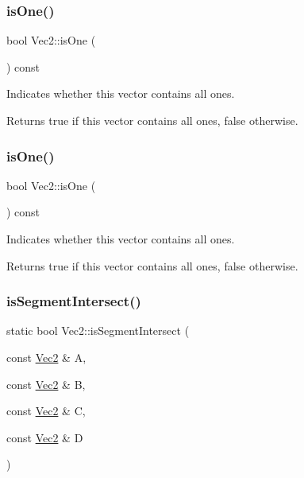 \subsubsection{\texorpdfstring{is\+One()}{isOne()}\hspace{0.1cm}{\footnotesize\ttfamily [1/2]}}
{\footnotesize\ttfamily bool Vec2\+::is\+One (\begin{DoxyParamCaption}{ }\end{DoxyParamCaption}) const\hspace{0.3cm}{\ttfamily [inline]}}

Indicates whether this vector contains all ones.

\begin{DoxyReturn}{Returns}
true if this vector contains all ones, false otherwise. 
\end{DoxyReturn}
\mbox{\label{classVec2_a3fad8b882142f8e96c4b50a2a8c5d1a6}} 
\subsubsection{\texorpdfstring{is\+One()}{isOne()}\hspace{0.1cm}{\footnotesize\ttfamily [2/2]}}
{\footnotesize\ttfamily bool Vec2\+::is\+One (\begin{DoxyParamCaption}{ }\end{DoxyParamCaption}) const\hspace{0.3cm}{\ttfamily [inline]}}

Indicates whether this vector contains all ones.

\begin{DoxyReturn}{Returns}
true if this vector contains all ones, false otherwise. 
\end{DoxyReturn}
\mbox{\label{classVec2_a8c71387fe5009ce9d7c53aa705cd2e3b}} 
\subsubsection{\texorpdfstring{is\+Segment\+Intersect()}{isSegmentIntersect()}\hspace{0.1cm}{\footnotesize\ttfamily [1/2]}}
{\footnotesize\ttfamily static bool Vec2\+::is\+Segment\+Intersect (\begin{DoxyParamCaption}\item[{const \hyperlink{classVec2}{Vec2} \&}]{A,  }\item[{const \hyperlink{classVec2}{Vec2} \&}]{B,  }\item[{const \hyperlink{classVec2}{Vec2} \&}]{C,  }\item[{const \hyperlink{classVec2}{Vec2} \&}]{D }\end{DoxyParamCaption})\hspace{0.3cm}{\ttfamily [static]}}

